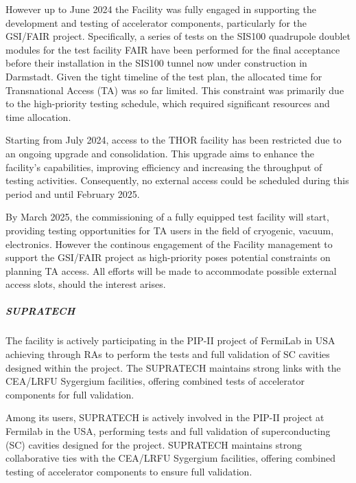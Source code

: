 However up to June 2024 the Facility was fully engaged in supporting the development and testing of accelerator components, particularly for the GSI/FAIR project. Specifically, a series of tests on the SIS100 quadrupole doublet modules for the test facility FAIR have been performed for the final acceptance before their installation in the SIS100 tunnel now under construction in Darmstadt. Given the tight timeline of the test plan, the allocated time for Transnational Access (TA) was so far limited. This constraint was primarily due to the high-priority testing schedule, which required significant resources and time allocation.

Starting from July 2024, access to the THOR facility has been restricted due to an ongoing upgrade and consolidation. This upgrade aims to enhance the facility’s capabilities, improving efficiency and increasing the throughput of testing activities. Consequently, no external access could be scheduled during this period and until February 2025.

By March 2025, the commissioning of a fully equipped test facility will start, providing testing opportunities for TA users in the field of cryogenic, vacuum, electronics. However the continous engagement of the Facility management to support the GSI/FAIR project as high-priority poses potential constraints on planning TA access. All efforts will be made to accommodate possible external access slots, should the interest arises. 

\subparagraph{SUPRATECH}

The facility is actively participating in the PIP-II project of FermiLab in USA achieving through RAs to perform the tests and full validation of SC cavities designed within the project. The SUPRATECH maintains strong links with the CEA/LRFU Sygergium facilities, offering combined tests of accelerator components for full validation. 

Among its users, SUPRATECH is actively involved in the PIP-II project at Fermilab in the USA, performing tests and full validation of superconducting (SC) cavities designed for the project. SUPRATECH maintains strong collaborative ties with the CEA/LRFU Sygergium facilities, offering combined testing of accelerator components to ensure full validation.



